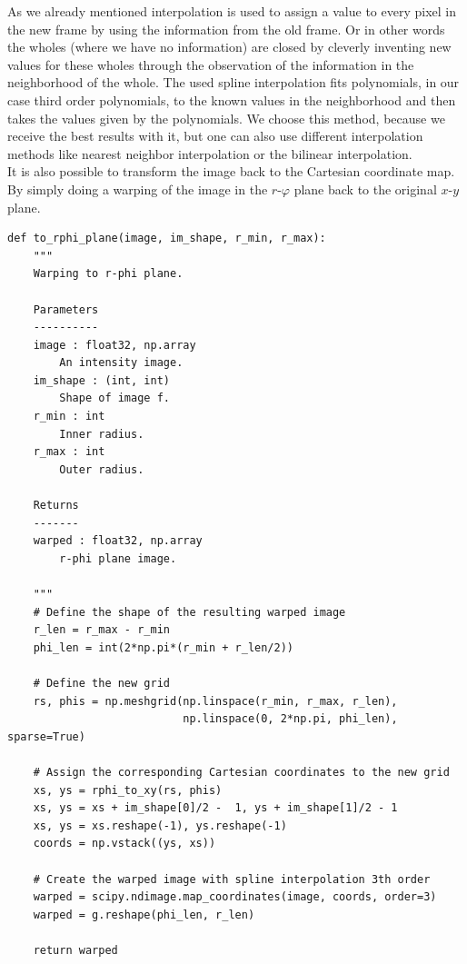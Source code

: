 As we already mentioned interpolation is used to assign a value to every pixel in the new frame by using the information from the old frame. Or in other words the wholes (where we have no information) are closed by cleverly inventing new values for these wholes through the observation of the information in the neighborhood of the whole. The used spline interpolation fits polynomials, in our case third order polynomials, to the known values in the neighborhood and then takes the values given by the polynomials. We choose this method, because we receive the best results with it, but one can also use different interpolation methods like nearest neighbor interpolation or the bilinear interpolation. \\
It is also possible to transform the image back to the Cartesian coordinate map. By simply doing a warping of the image in the $r$-$\varphi$ plane back to the original $x$-$y$ plane.
\lstset{language=Python, numbers = none}
\begin{lstlisting}[frame=lines]
def to_rphi_plane(image, im_shape, r_min, r_max):
    """
    Warping to r-phi plane.

    Parameters
    ----------
    image : float32, np.array 
        An intensity image.
    im_shape : (int, int)
        Shape of image f.
    r_min : int
        Inner radius.
    r_max : int
        Outer radius.

    Returns
    -------
    warped : float32, np.array 
        r-phi plane image. 

    """
    # Define the shape of the resulting warped image
    r_len = r_max - r_min
    phi_len = int(2*np.pi*(r_min + r_len/2))
    
	# Define the new grid    
    rs, phis = np.meshgrid(np.linspace(r_min, r_max, r_len), 
                           np.linspace(0, 2*np.pi, phi_len), sparse=True)
    
    # Assign the corresponding Cartesian coordinates to the new grid
    xs, ys = rphi_to_xy(rs, phis)
    xs, ys = xs + im_shape[0]/2 -  1, ys + im_shape[1]/2 - 1
    xs, ys = xs.reshape(-1), ys.reshape(-1)
    coords = np.vstack((ys, xs))
    
    # Create the warped image with spline interpolation 3th order
    warped = scipy.ndimage.map_coordinates(image, coords, order=3)
    warped = g.reshape(phi_len, r_len)
    
    return warped
\end{lstlisting}
